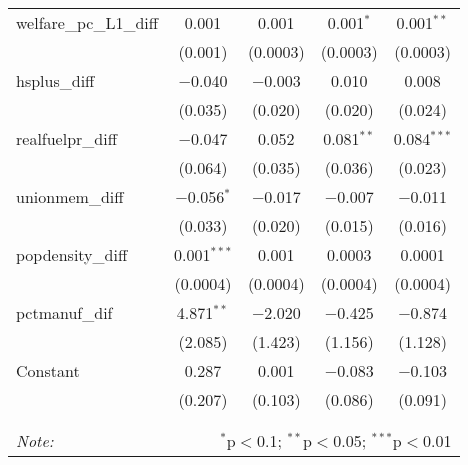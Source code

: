 \begin{table}[!htbp]
\begin{tabular}{@{\extracolsep{5pt}}lcccc}
  welfare\_pc\_L1\_diff & 0.001 & 0.001 & 0.001$^{*}$ & 0.001$^{**}$ \\ 
  & (0.001) & (0.0003) & (0.0003) & (0.0003) \\ 
  hsplus\_diff & $-$0.040 & $-$0.003 & 0.010 & 0.008 \\ 
  & (0.035) & (0.020) & (0.020) & (0.024) \\ 
  realfuelpr\_diff & $-$0.047 & 0.052 & 0.081$^{**}$ & 0.084$^{***}$ \\ 
  & (0.064) & (0.035) & (0.036) & (0.023) \\ 
  unionmem\_diff & $-$0.056$^{*}$ & $-$0.017 & $-$0.007 & $-$0.011 \\ 
  & (0.033) & (0.020) & (0.015) & (0.016) \\ 
  popdensity\_diff & 0.001$^{***}$ & 0.001 & 0.0003 & 0.0001 \\ 
  & (0.0004) & (0.0004) & (0.0004) & (0.0004) \\ 
  pctmanuf\_dif & 4.871$^{**}$ & $-$2.020 & $-$0.425 & $-$0.874 \\ 
  & (2.085) & (1.423) & (1.156) & (1.128) \\ 
  Constant & 0.287 & 0.001 & $-$0.083 & $-$0.103 \\ 
  & (0.207) & (0.103) & (0.086) & (0.091) \\ 
 \hline \\[-1.8ex] 
\hline 
\hline \\[-1.8ex] 
\textit{Note:}  & \multicolumn{4}{r}{$^{*}$p$<$0.1; $^{**}$p$<$0.05; $^{***}$p$<$0.01} \\ 
\end{tabular} 
\end{table} 
